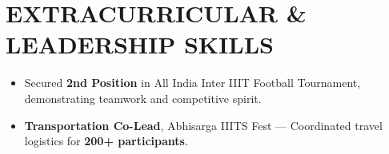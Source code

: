 \documentclass[letterpaper,11pt]{article}
\newcommand{\resumeItem}[1]{
  \item\small{
    {#1 \vspace{-2pt}}
  }
}
\newcommand{\resumeSubHeadingListStart}{\begin{itemize}[leftmargin=0.0in, label={}]}
\newcommand{\resumeSubHeadingListEnd}{\end{itemize}}
\newcommand{\resumeItemListStart}{\begin{itemize}}
\newcommand{\resumeItemListEnd}{\end{itemize}\vspace{-5pt}}
\begin{document}
\vspace{-0.15cm}

\section{\textbf{\sffamily EXTRACURRICULAR \& LEADERSHIP SKILLS}}
\resumeSubHeadingListStart

    \resumeItemListStart
    \vspace{0.1cm}
        \resumeItem{\sffamily \normalsize{Secured \textbf{2nd Position} in All India Inter IIIT Football Tournament, demonstrating teamwork and competitive spirit.}}
\vspace{-0.25cm}
\resumeItem{\sffamily \normalsize{\textbf{Transportation Co-Lead}, Abhisarga IIITS Fest — Coordinated travel logistics for \textbf{200+ participants}.}}

    \resumeItemListEnd
\resumeSubHeadingListEnd
\vspace{-10pt}
\end{document}
